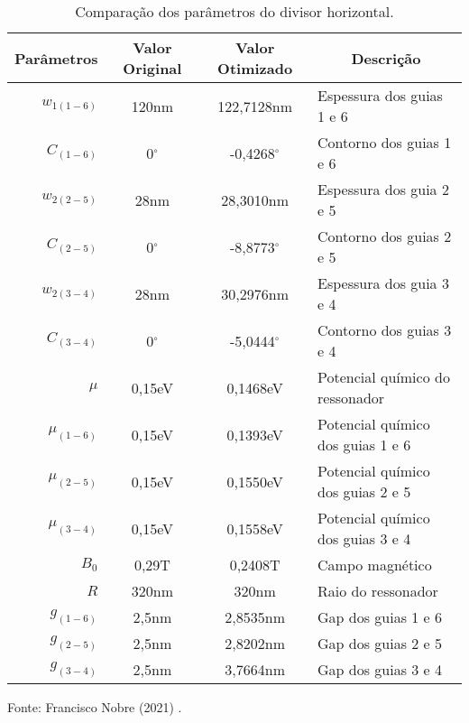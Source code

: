 



\begin{table}[H]
    \centering
    \caption{Comparação dos parâmetros do divisor horizontal.}
    \begin{tabular}{rccl}
    \hline
\multicolumn{1}{c}{Parâmetros} & Valor Original & Valor Otimizado   & \multicolumn{1}{c}{Descrição}     \\ \hline
$w_{1(1-6)}$                   & 120nm          & 122,7128nm        & Espessura dos guias 1 e 6         \\
$C_{(1-6)}$                    & 0$^{\circ}$    & -0,4268$^{\circ}$ & Contorno dos guias 1 e 6          \\
$w_{2(2-5)}$                   & 28nm           & 28,3010nm         & Espessura dos guia 2 e 5          \\
$C_{(2-5)}$                    & 0$^{\circ}$    & -8,8773$^{\circ}$ & Contorno dos guias 2 e 5          \\
$w_{2(3-4)}$                   & 28nm           & 30,2976nm         & Espessura dos guia 3 e 4          \\
$C_{(3-4)}$                    & 0$^{\circ}$    & -5,0444$^{\circ}$ & Contorno dos guias 3 e 4          \\
$\mu$                          & 0,15eV         & 0,1468eV          & Potencial químico do ressonador   \\
$\mu_{(1-6)}$                  & 0,15eV         & 0,1393eV          & Potencial químico dos guias 1 e 6 \\
$\mu_{(2-5)}$                  & 0,15eV         & 0,1550eV          & Potencial químico dos guias 2 e 5 \\
$\mu_{(3-4)}$                  & 0,15eV         & 0,1558eV          & Potencial químico dos guias 3 e 4 \\
$B_{0}$                        & 0,29T          & 0,2408T           & Campo magnético                   \\
$R$                            & 320nm          & 320nm             & Raio do ressonador                \\
$g_{(1-6)}$                    & 2,5nm          & 2,8535nm          & Gap dos guias 1 e 6               \\
$g_{(2-5)}$                    & 2,5nm          & 2,8202nm          & Gap dos guias 2 e 5               \\
$g_{(3-4)}$                    & 2,5nm          & 3,7664nm          & Gap dos guias 3 e 4               \\ \hline
\end{tabular}

    \label{tab: VariaveisHorizontal_Loop_38}

    \vspace{2.5mm}
    Fonte: Francisco Nobre (2021) \cite{Nobre2021Graphene}.

    \end{table}